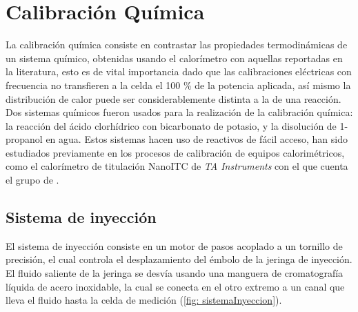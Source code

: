 
%




\chapter{Calibraci\'on Qu\'imica}\label{ch: chemical}
	La calibraci\'on qu\'imica consiste en contrastar las propiedades termodin\'amicas de un sistema qu\'imico, obtenidas usando el calor\'imetro con aquellas reportadas en la literatura, esto es de vital importancia dado que las calibraciones el\'ectricas con frecuencia no transfieren a la celda el 100 \% de la potencia aplicada, as\'i mismo la distribuci\'on de calor puede ser considerablemente distinta a la de una reacci\'on. Dos sistemas qu\'imicos fueron usados para la realizaci\'on de la calibraci\'on qu\'imica: la reacci\'on del \'acido clorhídrico con bicarbonato de potasio, y la disoluci\'on de 1-propanol en agua. Estos sistemas hacen uso de reactivos de f\'acil acceso, han sido estudiados previamente en los procesos de calibraci\'on de equipos calorim\'etricos, como el calor\'imetro de titulaci\'on NanoITC de \textit{TA Instruments} con el que cuenta el grupo de \groupname{} \cite{demarse2011calibration, adao2012chemical, nanoitc}. %

\section{Sistema de inyecci\'on}
	El sistema de inyecci\'on consiste en un motor de pasos acoplado a un tornillo de precisión, el cual controla el desplazamiento del émbolo de la jeringa de inyección. El fluido saliente de la jeringa se desvía usando una manguera de cromatografía líquida de acero inoxidable, la cual se conecta en el otro extremo a un canal que lleva el fluido hasta la celda de medición (\autoref{fig: sistemaInyeccion}).
	
